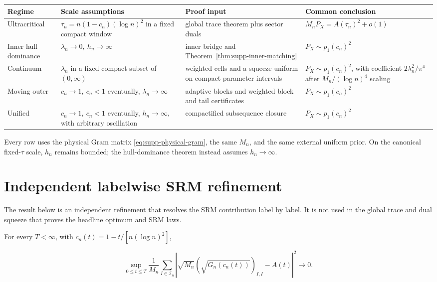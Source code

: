 \begin{center}
\small
\begin{tabularx}{\linewidth}{@{}l
 >{\raggedright\arraybackslash}X
 >{\raggedright\arraybackslash}X
 >{\raggedright\arraybackslash}X@{}}
\toprule
Regime & Scale assumptions & Proof input & Common conclusion\\
\midrule
Ultracritical &
\(\tau_n=n(1-c_n)(\log n)^2\) in a fixed compact window &
global trace theorem plus sector duals &
\(M_nP_X=A(\tau_n)^2+o(1)\)\\
Inner hull dominance &
\(\lambda_n\to0,\ h_n\to\infty\) &
inner bridge and Theorem~\ref{thm:supp-inner-matching} &
\(P_X\sim p_1(c_n)^2\)\\
Continuum &
\(\lambda_n\) in a fixed compact subset of \((0,\infty)\) &
weighted cells and a squeeze uniform on compact parameter intervals &
\(P_X\sim p_1(c_n)^2\), with coefficient
\(2\lambda_n^2/\pi^4\) after \(M_n/(\log n)^4\) scaling\\
Moving outer &
\(c_n\to1,\ c_n<1\) eventually, \(\lambda_n\to\infty\) &
adaptive blocks and weighted block and tail certificates &
\(P_X\sim p_1(c_n)^2\)\\
Unified &
\(c_n\to1,\ c_n<1\) eventually, \(h_n\to\infty\), with arbitrary
oscillation &
compactified subsequence closure &
\(P_X\sim p_1(c_n)^2\)\\
\bottomrule
\end{tabularx}
\end{center}

Every row uses the physical Gram matrix
\eqref{eq:supp-physical-gram}, the same \(M_n\), and the same external uniform
prior. On the canonical fixed-\(\tau\) scale, \(h_n\) remains bounded; the
hull-dominance theorem instead assumes \(h_n\to\infty\).

\section{Independent labelwise SRM refinement}
\label{supp:direct-srm}

The result below is an independent refinement that resolves the SRM
contribution label by label.  It is not used in the global trace and dual
squeeze that proves the headline optimum and SRM laws.

\begin{theorem}
\label{thm:supp-full-local-law}
For every \(T<\infty\), with
\(c_n(t)=1-t/[n(\log n)^2]\),

\begin{equation}\label{eq:supp-full-local-law}
 \sup_{0\le t\le T}\frac1{M_n}\sum_{I\in\mathcal I_n}
 \left|\sqrt{M_n}(\sqrt{G_n(c_n(t))})_{I,I}-A(t)\right|^2
 \longrightarrow0.
\end{equation}
\end{theorem}

